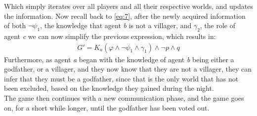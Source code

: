 Which simply iterates over all players and all their respective worlds, and
updates the information. Now recall back to \cref{eq:7}, after the newly
acquired information of both $\neg \psi_1$, the knowledge that agent \textit{b} 
is not a villager, and $\gamma_2$, the role of agent \textit{c} we can now 
simplify the previous expression, which results in:
\begin{align}
	G' = K_a(\varphi \land \neg \psi_1 \land \gamma_1) \land \neg p \land q
\end{align}
Furthermore, as agent \textit{a} began with the knowledge of agent \textit{b} 
being either a godfather, or a villager, and they now know that they are not a 
villager, they can infer that they must be a godfather, since that is the only 
world that has not been excluded, based on the knowledge they gained during the 
night. \\
The game then continues with a new communication phase, and the game goes on, 
for a short while longer, until the godfather has been voted out.
